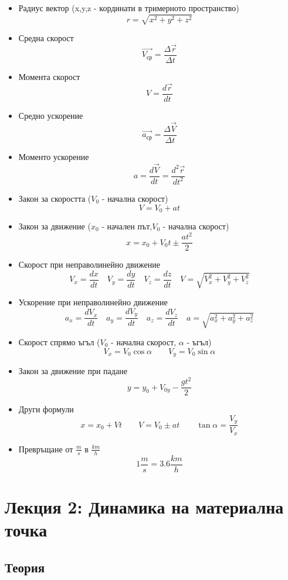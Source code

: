 \documentclass[fleqn, 12pt]{article}
\theoremstyle{definition}
\begin{document}
\begin{itemize}
\item Радиус вектор (x,y,z - кординати в тримерното пространство)
$$r= \sqrt{x^2 + y^2 + z^2}$$
\item Средна скорост
$$\vec{V_{\text{ср}}} = \frac{\Delta \vec{r}}{\Delta t}$$
\item Момента скорост
$$V = \frac{d\vec{r}}{dt}$$
\item Средно ускорение
$$\vec{a_{\text{ср}}} = \frac{\Delta \vec{V}}{\Delta t} $$
\item Моменто ускорение
$$a = \frac{d\vec{V}}{dt} = \frac{d^2 \vec{r}}{dt^2}$$
\item Закон за скоростта ($V_0$ - начална скорост)
$$V = V_0 + at$$
\item Закон за движение ($x_0$ - начален път,$V_0$ - начална скорост)
$$x = x_0 + V_0t \pm \frac{at^2}{2}$$
\item Скорост при неправолинейно движение
$$V_x = \frac{dx}{dt} \quad V_y = \frac{dy}{dt} \quad V_z = \frac{dz}{dt} \quad V = \sqrt{V_x^2 + V_y^2 + V_z^2}$$
\item Ускорение при неправолинейно движение
$$a_x = \frac{dV_x}{dt} \quad a_y = \frac{dV_y}{dt} \quad a_z = \frac{dV_z}{dt}  \quad a = \sqrt{a_x^2 + a_y^2 + a_z^2}$$
\item Скорост спрямо ъгъл ($V_0$ - начална скорост, $\alpha$ - ъгъл)
$$V_x = V_0 \cos \alpha \qquad V_y = V_0 \sin \alpha$$
\item Закон за движение при падане
$$y = y_0 + V_{0y} - \frac{gt^2}{2} $$
\item Други формули
$$x = x_0 + Vt \qquad V = V_0 \pm at \qquad \tan \alpha = \frac{V_y}{V_x}$$
\item Превръщане от $\frac{m}{s}$ в $\frac{km}{h}$ 
$$1 \frac{m}{s} = 3.6 \frac{km}{h}$$
\end{itemize}

\newpage
\section{Лекция 2: Динамика на материална точка}

\subsection{Теория}
\end{document}
